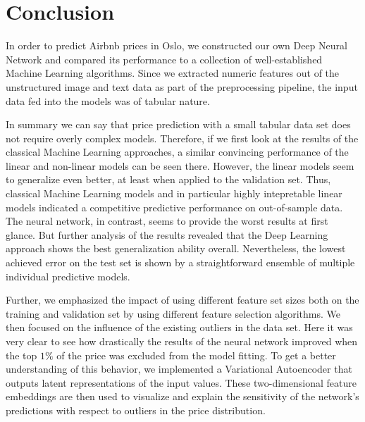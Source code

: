 \section{Conclusion}

In order to predict Airbnb prices in Oslo, we constructed our own Deep Neural Network and compared its performance to a collection of well-established Machine Learning algorithms.
Since we extracted numeric features out of the unstructured image and text data as part of the preprocessing pipeline, the input data fed into the models was of tabular nature.

In summary we can say that price prediction with a small tabular data set does not require overly complex models. Therefore, if we first look at the results of the classical Machine Learning approaches, a similar convincing performance of the linear and non-linear models can be seen there. However, the linear models seem to generalize even better, at least when applied to the validation set. Thus, classical Machine Learning models and in particular highly intepretable linear models indicated a competitive predictive performance on out-of-sample data. 
The neural network, in contrast, seems to provide the worst results at first glance. But further analysis of the results revealed that the Deep Learning approach shows the best generalization ability overall. 
Nevertheless, the lowest achieved error on the test set is shown by a straightforward ensemble of multiple individual predictive models. 



Further, we emphasized the impact of using different feature set sizes both on the training and validation set by using different feature selection algorithms.
We then focused on the influence of the existing outliers in the data set. Here it was very clear to see how drastically the results of the neural network improved when the top $1\%$ of the price was excluded from the model fitting. To get a better understanding of this behavior, we implemented a Variational Autoencoder that outputs latent representations of the input values. These two-dimensional feature embeddings are then used to visualize and explain the sensitivity of the network's predictions with respect to outliers in the price distribution.

